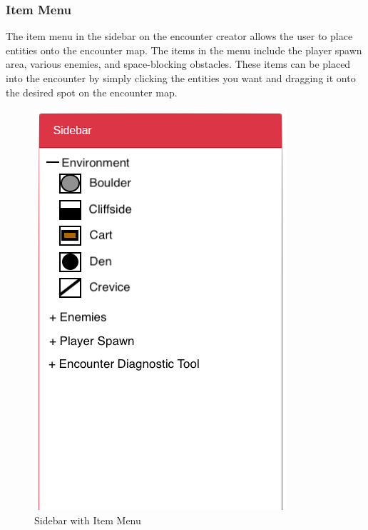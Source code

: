 \documentclass[12pt,a4paper]{report}
\begin{document}
			\subsubsection{Item Menu}
			The item menu in the sidebar on the encounter creator allows the user to place entities onto the encounter map. The items in the menu include the player spawn area, various enemies, and space-blocking obstacles. These items can be placed into the encounter by simply clicking the entities you want and dragging it onto the desired spot on the encounter map.
			\bigskip
			\begin{figure}[H]
				\centering
				\includegraphics[scale=.7]{sidebaritemmenu}
				\caption{Sidebar with Item Menu}
				\label{fig: Sidebar with Item Menu}
			\end{figure}
		\newpage
\end{document}
